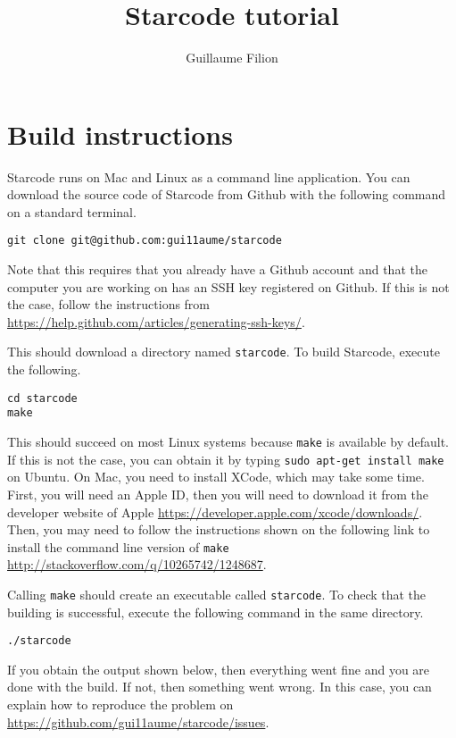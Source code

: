 \documentclass[12pt]{article}
\title{Starcode tutorial}
\author{Guillaume Filion}
\begin{document}
\maketitle

\section{Build instructions}

Starcode runs on Mac and Linux as a command line application.
You can download the source code of Starcode from Github with
the following command on a standard terminal.

\begin{verbatim}
git clone git@github.com:gui11aume/starcode
\end{verbatim}

Note that this requires that you already have a Github account
and that the computer you are working on has an SSH  key registered
on Github. If this is not the case, follow the instructions from
\url{https://help.github.com/articles/generating-ssh-keys/}.

This should download a directory named \texttt{starcode}. To build
Starcode, execute the following.

\begin{verbatim}
cd starcode
make
\end{verbatim}

This should succeed on most Linux systems because \texttt{make} is
available by default. If this is not the case, you can obtain it by
typing \texttt{sudo apt-get install make} on Ubuntu. On Mac, you need
to install XCode, which may take some time. First, you will need an
Apple ID, then you will need to download it from the developer
website of Apple \url{https://developer.apple.com/xcode/downloads/}.
Then, you may need to follow the instructions shown on the following
link to install the command line version of \texttt{make}
\url{http://stackoverflow.com/q/10265742/1248687}.

Calling \texttt{make} should create an executable called
\texttt{starcode}. To check that the building is successful, execute
the following command in the same directory.

\begin{verbatim}
./starcode
\end{verbatim}

If you obtain the output shown below, then everything went fine
and you are done with the build. If not, then something went
wrong. In this case, you can explain how to reproduce the problem
on \url{https://github.com/gui11aume/starcode/issues}.
\end{document}
